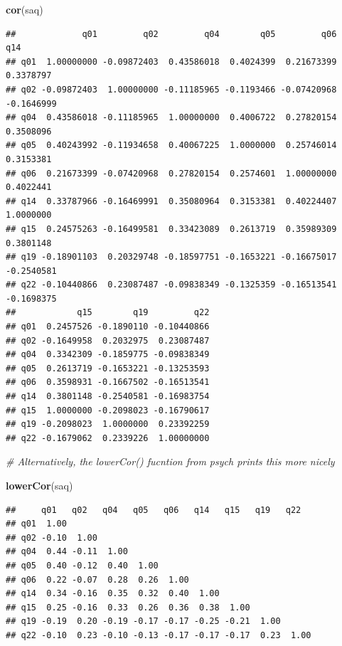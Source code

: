 \documentclass[
]{book}
\newenvironment{Shaded}{\begin{snugshade}}{\end{snugshade}}
\newcommand{\CommentTok}[1]{\textcolor[rgb]{0.56,0.35,0.01}{\textit{#1}}}
\newcommand{\FunctionTok}[1]{\textcolor[rgb]{0.13,0.29,0.53}{\textbf{#1}}}
\newcommand{\NormalTok}[1]{#1}
\begin{document}
\begin{Shaded}
\begin{Highlighting}[]
\FunctionTok{cor}\NormalTok{(saq)}
\end{Highlighting}
\end{Shaded}

\begin{verbatim}
##             q01         q02         q04        q05         q06        q14
## q01  1.00000000 -0.09872403  0.43586018  0.4024399  0.21673399  0.3378797
## q02 -0.09872403  1.00000000 -0.11185965 -0.1193466 -0.07420968 -0.1646999
## q04  0.43586018 -0.11185965  1.00000000  0.4006722  0.27820154  0.3508096
## q05  0.40243992 -0.11934658  0.40067225  1.0000000  0.25746014  0.3153381
## q06  0.21673399 -0.07420968  0.27820154  0.2574601  1.00000000  0.4022441
## q14  0.33787966 -0.16469991  0.35080964  0.3153381  0.40224407  1.0000000
## q15  0.24575263 -0.16499581  0.33423089  0.2613719  0.35989309  0.3801148
## q19 -0.18901103  0.20329748 -0.18597751 -0.1653221 -0.16675017 -0.2540581
## q22 -0.10440866  0.23087487 -0.09838349 -0.1325359 -0.16513541 -0.1698375
##            q15        q19         q22
## q01  0.2457526 -0.1890110 -0.10440866
## q02 -0.1649958  0.2032975  0.23087487
## q04  0.3342309 -0.1859775 -0.09838349
## q05  0.2613719 -0.1653221 -0.13253593
## q06  0.3598931 -0.1667502 -0.16513541
## q14  0.3801148 -0.2540581 -0.16983754
## q15  1.0000000 -0.2098023 -0.16790617
## q19 -0.2098023  1.0000000  0.23392259
## q22 -0.1679062  0.2339226  1.00000000
\end{verbatim}

\begin{Shaded}
\begin{Highlighting}[]
\CommentTok{\# Alternatively, the lowerCor() fucntion from psych prints this more nicely}

\FunctionTok{lowerCor}\NormalTok{(saq)}
\end{Highlighting}
\end{Shaded}

\begin{verbatim}
##     q01   q02   q04   q05   q06   q14   q15   q19   q22  
## q01  1.00                                                
## q02 -0.10  1.00                                          
## q04  0.44 -0.11  1.00                                    
## q05  0.40 -0.12  0.40  1.00                              
## q06  0.22 -0.07  0.28  0.26  1.00                        
## q14  0.34 -0.16  0.35  0.32  0.40  1.00                  
## q15  0.25 -0.16  0.33  0.26  0.36  0.38  1.00            
## q19 -0.19  0.20 -0.19 -0.17 -0.17 -0.25 -0.21  1.00      
## q22 -0.10  0.23 -0.10 -0.13 -0.17 -0.17 -0.17  0.23  1.00
\end{verbatim}
\end{document}
